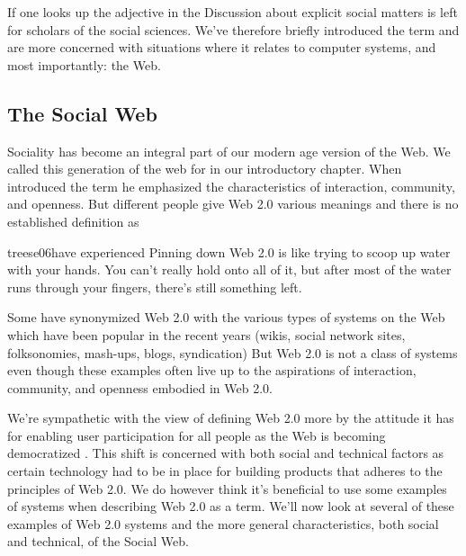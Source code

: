 If one looks up the adjective  in the
Discussion about explicit social matters is left for scholars of the social
sciences. We've therefore briefly introduced the term and are more concerned
with situations where it relates to computer systems, and most importantly:
the Web.

\subsection{The Social Web}
\label{section:social.navigation.sociality.the.social.web}

Sociality has become an integral part of our modern age version of the Web.
We called this generation of the web for %
in our introductory chapter. When \citet{oreilly05} introduced the term he
emphasized the characteristics of interaction, community, and openness.
But different people give Web 2.0 various meanings and there is no
established definition as
\begin{fullquote}[\p{15}]{treese06}{have experienced}
  Pinning down Web 2.0 is like trying to scoop up water with your hands. You
  can't really hold onto all of it, but after most of the water runs through
  your fingers, there's still something left.
\end{fullquote}

Some have synonymized Web 2.0 with the various types of systems on the
Web which have been popular in the recent years
(wikis, social network sites, folksonomies, mash-ups, blogs, syndication)
But Web 2.0 is not a class of systems \citep[]{millard06} even though
these examples often live up to the aspirations of interaction, community,
and openness embodied in Web 2.0.

We're sympathetic with the view of defining
Web 2.0 more by the attitude it has for enabling user participation for all
people \citep[]{lin07} as the Web is becoming democratized
\citep{graham05}. This shift is concerned with both social and
technical factors as certain technology had to be in place for building
products that adheres to the principles of Web 2.0. We do however think it's
beneficial to use some examples of systems when describing Web 2.0 as a term.
We'll now look at several of these examples of Web 2.0 systems and
the more general characteristics, both social and technical,
of the Social Web.

